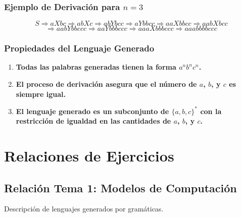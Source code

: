 \documentclass[12pt]{report} %
\providecommand{\tightlist}{%
  \setlength{\itemsep}{0pt}\setlength{\parskip}{0pt}}
\begin{document}
\hypertarget{ejemplo-de-derivaciuxf3n-para-n-3}{%
\subsection{\texorpdfstring{Ejemplo de Derivación para
\(n = 3\)}{Ejemplo de Derivación para n = 3}}\label{ejemplo-de-derivaciuxf3n-para-n-3}}

\[
S \Rightarrow aXbc \Rightarrow abXc \Rightarrow abYbcc \Rightarrow aYbbcc \Rightarrow aaXbbcc \Rightarrow aabXbcc 
\] \[
\Rightarrow aabYbbccc \Rightarrow aaYbbbccc \Rightarrow aaaXbbbccc \Rightarrow aaabbbbccc
\]

\hypertarget{propiedades-del-lenguaje-generado-1}{%
\subsection{Propiedades del Lenguaje
Generado}\label{propiedades-del-lenguaje-generado-1}}

\begin{enumerate}
\def\labelenumi{\arabic{enumi}.}
\tightlist
\item
  \textbf{Todas las palabras generadas tienen la forma
  \(a^n b^n c^n\).}\\
\item
  \textbf{El proceso de derivación asegura que el número de \(a\),
  \(b\), y \(c\) es siempre igual.}\\
\item
  \textbf{El lenguaje generado es un subconjunto de \(\{a, b, c\}^*\)
  con la restricción de igualdad en las cantidades de \(a\), \(b\), y
  \(c\).}
\end{enumerate}

\chapter{Relaciones de Ejercicios}

\hypertarget{relaciuxf3n-tema-1-modelos-de-computaciuxf3n}{%
\section{Relación Tema 1: Modelos de
Computación}\label{relaciuxf3n-tema-1-modelos-de-computaciuxf3n}}

\begin{ejercicio}
Descripción de lenguajes generados por gramáticas.
\end{ejercicio}
\end{document}
